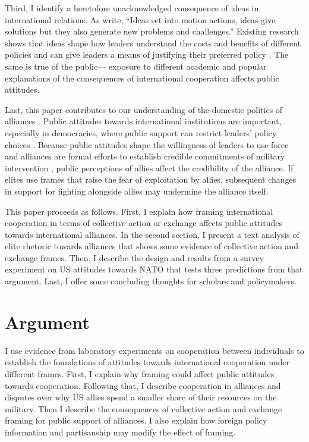 \documentclass[12pt]{article}
\begin{document}
Third, I identify a heretofore unacknowledged consequence of ideas in international relations. 
As \citet[pg. 50]{BoettkeAligica2009} write, ``Ideas set into motion actions, ideas give solutions but they also generate new problems and challenges.''
Existing research shows that ideas shape how leaders understand the costs and benefits of different policies \citep{Morrison2012, Morrison2016} and can give leaders a means of justifying their preferred policy \citep{Parsons2002}.
The same is true of the public--- exposure to different academic and popular explanations of the consequences of international cooperation affects public attitudes.


Last, this paper contributes to our understanding of the domestic politics of alliances \citep{Lobell2004, Mattes2012a}.
Public attitudes towards international institutions are important, especially in democracies, where public support can restrict leaders' policy choices \citep{Putnam1988, Fearon1998, LevenduskyHorowitz2012, Williams2013, Levyetal2015}. 
Because public attitudes shape the willingness of leaders to use force \citep{Tomzetal2020} and alliances are formal efforts to establish credible commitments of military intervention \citep{Morrow2000}, public perceptions of allies affect the credibility of the alliance. 
If elites use frames that raise the fear of exploitation by allies, subsequent changes in support for fighting alongside allies may undermine the alliance itself.  


This paper proceeds as follows. 
First, I explain how framing international cooperation in terms of collective action or exchange affects public attitudes towards international alliances. 
In the second section, I present a text analysis of elite rhetoric towards alliances that shows some evidence of collective action and exchange frames. 
Then, I describe the design and results from a survey experiment on US attitudes towards NATO that tests three predictions from that argument. 
Last, I offer some concluding thoughts for scholars and policymakers. 


\section{Argument}


I use evidence from laboratory experiments on cooperation between individuals to establish the foundations of attitudes towards international cooperation under different frames. 
First, I explain why framing could affect public attitudes towards cooperation.
Following that, I describe cooperation in alliances and disputes over why US allies spend a smaller share of their resources on the military.  
Then I describe the consequences of collective action and exchange framing for public support of alliances. 
I also explain how foreign policy information and partisanship may modify the effect of framing. 
\end{document}
